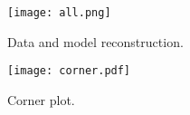 \documentclass[12pt]{article}
\begin{document}


\begin{figure}[!htb]
	\centering
	\texttt{[image: all.png]}
	\caption{Data and model reconstruction. \label{fig:all}}
\end{figure}






\clearpage
\pagebreak

\begin{figure}[!htb]
	\centering
	\texttt{[image: corner.pdf]}
	\caption{Corner plot. \label{fig:corner}}
\end{figure}

\clearpage
\pagebreak
\end{document}
